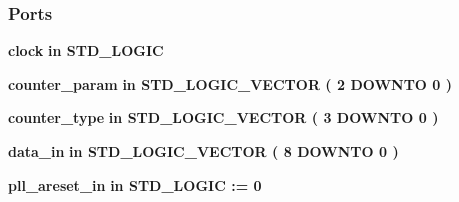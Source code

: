 \subsubsection*{Ports}
 \begin{DoxyCompactItemize}
\item 
{\bf clock}  {\bfseries {\bfseries \textcolor{keywordflow}{in}\textcolor{vhdlchar}{ }}} {\bfseries \textcolor{comment}{S\+T\+D\+\_\+\+L\+O\+G\+IC}\textcolor{vhdlchar}{ }} 
\item 
{\bf counter\+\_\+param}  {\bfseries {\bfseries \textcolor{keywordflow}{in}\textcolor{vhdlchar}{ }}} {\bfseries \textcolor{comment}{S\+T\+D\+\_\+\+L\+O\+G\+I\+C\+\_\+\+V\+E\+C\+T\+OR}\textcolor{vhdlchar}{ }\textcolor{vhdlchar}{(}\textcolor{vhdlchar}{ }\textcolor{vhdlchar}{ } \textcolor{vhdldigit}{2} \textcolor{vhdlchar}{ }\textcolor{keywordflow}{D\+O\+W\+N\+TO}\textcolor{vhdlchar}{ }\textcolor{vhdlchar}{ } \textcolor{vhdldigit}{0} \textcolor{vhdlchar}{ }\textcolor{vhdlchar}{)}\textcolor{vhdlchar}{ }} 
\item 
{\bf counter\+\_\+type}  {\bfseries {\bfseries \textcolor{keywordflow}{in}\textcolor{vhdlchar}{ }}} {\bfseries \textcolor{comment}{S\+T\+D\+\_\+\+L\+O\+G\+I\+C\+\_\+\+V\+E\+C\+T\+OR}\textcolor{vhdlchar}{ }\textcolor{vhdlchar}{(}\textcolor{vhdlchar}{ }\textcolor{vhdlchar}{ } \textcolor{vhdldigit}{3} \textcolor{vhdlchar}{ }\textcolor{keywordflow}{D\+O\+W\+N\+TO}\textcolor{vhdlchar}{ }\textcolor{vhdlchar}{ } \textcolor{vhdldigit}{0} \textcolor{vhdlchar}{ }\textcolor{vhdlchar}{)}\textcolor{vhdlchar}{ }} 
\item 
{\bf data\+\_\+in}  {\bfseries {\bfseries \textcolor{keywordflow}{in}\textcolor{vhdlchar}{ }}} {\bfseries \textcolor{comment}{S\+T\+D\+\_\+\+L\+O\+G\+I\+C\+\_\+\+V\+E\+C\+T\+OR}\textcolor{vhdlchar}{ }\textcolor{vhdlchar}{(}\textcolor{vhdlchar}{ }\textcolor{vhdlchar}{ } \textcolor{vhdldigit}{8} \textcolor{vhdlchar}{ }\textcolor{keywordflow}{D\+O\+W\+N\+TO}\textcolor{vhdlchar}{ }\textcolor{vhdlchar}{ } \textcolor{vhdldigit}{0} \textcolor{vhdlchar}{ }\textcolor{vhdlchar}{)}\textcolor{vhdlchar}{ }} 
\item 
{\bf pll\+\_\+areset\+\_\+in}  {\bfseries {\bfseries \textcolor{keywordflow}{in}\textcolor{vhdlchar}{ }}} {\bfseries \textcolor{comment}{S\+T\+D\+\_\+\+L\+O\+G\+IC}\textcolor{vhdlchar}{ }\textcolor{vhdlchar}{ }\textcolor{vhdlchar}{\+:}\textcolor{vhdlchar}{=}\textcolor{vhdlchar}{ }\textcolor{vhdlchar}{ }\textcolor{vhdlchar}{\textquotesingle{}}\textcolor{vhdlchar}{ } \textcolor{vhdldigit}{0} \textcolor{vhdlchar}{ }\textcolor{vhdlchar}{\textquotesingle{}}\textcolor{vhdlchar}{ }} 

\end{DoxyCompactItemize}
